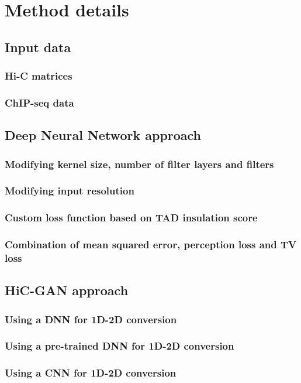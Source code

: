 \section{Method details}
\subsection{Input data}
\subsubsection{Hi-C matrices} \label{sec:methods:hicMatrices}
\subsubsection{ChIP-seq data}
\subsection{Deep Neural Network approach}
\subsubsection{Modifying kernel size, number of filter layers and filters}
\subsubsection{Modifying input resolution}
\subsubsection{Custom loss function based on TAD insulation score}
\subsubsection{Combination of mean squared error, perception loss and TV loss}
\subsection{HiC-GAN approach}
\subsubsection{Using a DNN for 1D-2D conversion}
\subsubsection{Using a pre-trained DNN for 1D-2D conversion}
\subsubsection{Using a CNN for 1D-2D conversion}
